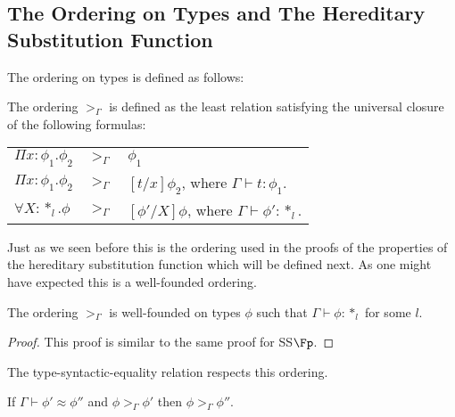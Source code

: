 \subsection{The Ordering on Types and The Hereditary Substitution Function}
\label{sec:the_hereditary_substitution_function_ssfe}
The ordering on types is defined as follows:
\begin{definition}
  The ordering $>_\Gamma$ is defined as the least relation satisfying the universal closure
  of the following formulas:
  \begin{center}
    \begin{tabular}{lll}
      $\Pi x:\phi_1.\phi_2$ & $>_\Gamma$ & $\phi_1$\\
      $\Pi x:\phi_1.\phi_2$ & $>_{\Gamma}$ & $[t/x]\phi_2$, where $\Gamma \vdash t:\phi_1$.\\
      $\forall X:*_l.\phi$  & $>_\Gamma$ & $[\phi'/X]\phi$, where $\Gamma \vdash \phi':*_l$.\\
    \end{tabular}
  \end{center}
  \label{def:ordering_ssfe}
\end{definition}
Just as we seen before this is the ordering used in the proofs of the
properties of the hereditary substitution function which will be
defined next.  As one might have expected this is a well-founded
ordering.
\begin{thm}
  The ordering $>_\Gamma$ is well-founded on types $\phi$ such that 
  $\Gamma \vdash \phi:*_l$ for some $l$.
  \label{thm:well-founded_ordering_ssfe}
\end{thm}
\begin{proof}
  This proof is similar to the same proof for SS$\Fp$.
\end{proof}
The type-syntactic-equality relation respects this ordering.
\begin{lemma}[]
  \label{lemma:typeq_ordering_ssfe}
  If $\Gamma \vdash \phi' \approx \phi''$ and $\phi >_{\Gamma} \phi'$ then $\phi >_\Gamma \phi''$.
\end{lemma}
